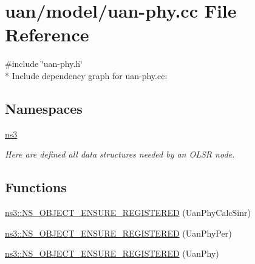 \hypertarget{uan-phy_8cc}{}\section{uan/model/uan-\/phy.cc File Reference}
\label{uan-phy_8cc}
{\ttfamily \#include \char`\"{}uan-\/phy.\+h\char`\"{}}\\*
Include dependency graph for uan-\/phy.cc\+:
\subsection*{Namespaces}
\begin{DoxyCompactItemize}
\item 
 \hyperlink{namespacens3}{ns3}
\begin{DoxyCompactList}\small\item\em Here are defined all data structures needed by an O\+L\+SR node. \end{DoxyCompactList}\end{DoxyCompactItemize}
\subsection*{Functions}
\begin{DoxyCompactItemize}
\item 
\hyperlink{namespacens3_a4321584efe9042561db96bd33f8f3c78}{ns3\+::\+N\+S\+\_\+\+O\+B\+J\+E\+C\+T\+\_\+\+E\+N\+S\+U\+R\+E\+\_\+\+R\+E\+G\+I\+S\+T\+E\+R\+ED} (Uan\+Phy\+Calc\+Sinr)
\item 
\hyperlink{namespacens3_a1ec81a0febd0a45f603c9feaf140cbbb}{ns3\+::\+N\+S\+\_\+\+O\+B\+J\+E\+C\+T\+\_\+\+E\+N\+S\+U\+R\+E\+\_\+\+R\+E\+G\+I\+S\+T\+E\+R\+ED} (Uan\+Phy\+Per)
\item 
\hyperlink{namespacens3_a24924205e9db6c916f1e158aebe4f15a}{ns3\+::\+N\+S\+\_\+\+O\+B\+J\+E\+C\+T\+\_\+\+E\+N\+S\+U\+R\+E\+\_\+\+R\+E\+G\+I\+S\+T\+E\+R\+ED} (Uan\+Phy)
\end{DoxyCompactItemize}

